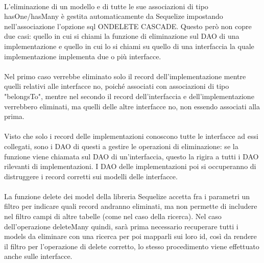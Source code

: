\documentclass[a4paper, 12pt]{report}
\begin{document}
      \paragraph*{}
      L'eliminazione di un modello e di tutte le sue associazioni di tipo hasOne/hasMany è gestita automaticamente da Sequelize impostando nell'associazione l'opzione sql ONDELETE CASCADE.
      Questo però non copre due casi: quello in cui si chiami la funzione di eliminazione sul DAO di una implementazione e quello in cui lo si chiami su quello di una interfaccia la quale implementazione implementa due o più interfacce.
      \paragraph*{}
      Nel primo caso verrebbe eliminato solo il record dell'implementazione mentre quelli relativi alle interfacce no, poiché associati con associazioni di tipo "belongsTo", mentre nel secondo il record dell'interfaccia e dell'implementazione verrebbero eliminati, ma quelli delle altre interfacce no, non essendo associati alla prima.
      \paragraph*{}
      Visto che solo i record delle implementazioni conoscono tutte le interfacce ad essi collegati, sono i DAO di questi a gestire le operazioni di eliminazione: se la funzione viene chiamata sul DAO di un'interfaccia, questo la rigira a tutti i DAO rilevanti di implementazioni.
      I DAO delle implementazioni poi si occuperanno di distruggere i record corretti sui modelli delle interfacce.
      \paragraph*{}
      La funzione delete dei model della libreria Sequelize accetta fra i parametri un filtro per indicare quali record andranno eliminati, ma non permette di includere nel filtro campi di altre tabelle (come nel caso della ricerca).
      Nel caso dell'operazione deleteMany quindi, sarà prima necessario recuperare tutti i models da eliminare con una ricerca per poi mapparli sui loro id, così da rendere il filtro per l'operazione di delete corretto, lo stesso procedimento viene effettuato anche sulle interfacce.
    \newpage
\end{document}
